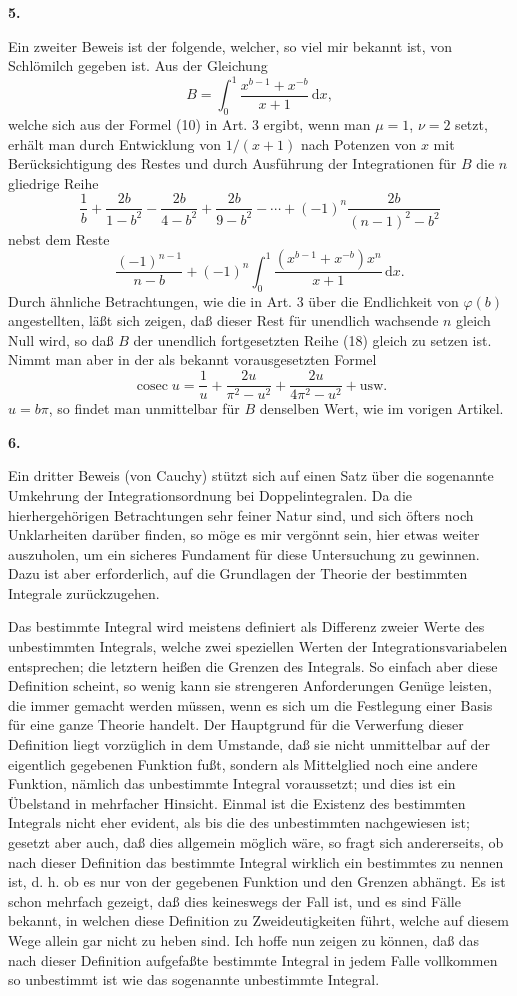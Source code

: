 \documentclass[11pt]{article}
\newcommand{\dd}{\,\mathrm d}
\newcommand{\cosec}{\operatorname{cosec}}
\newcommand{\art}[1]{\bigskip\begin{center}\large\bfseries #1.\end{center}\nopagebreak}
\begin{document}
\art{5}

Ein zweiter Beweis ist der folgende, welcher, so viel mir bekannt ist, von Schlömilch gegeben ist. Aus der Gleichung
\[
B=\int_0^1\frac{x^{b-1}+x^{-b}}{x+1}\dd x,
\]
welche sich aus der Formel (10) in Art. 3 ergibt, wenn man $\mu=1$, $\nu=2$ setzt, erhält man durch Entwicklung von $1/(x+1)$ nach Potenzen von $x$ mit Berücksichtigung des Restes und durch Ausführung der Integrationen für $B$ die $n$gliedrige Reihe
\begin{equation}
\frac1b+\frac{2b}{1-b^2}-\frac{2b}{4-b^2}+\frac{2b}{9-b^2}-\cdots+(-1)^n\frac{2b}{(n-1)^2-b^2}
\tag{18}
\end{equation}
nebst dem Reste
\[
\frac{(-1)^{n-1}}{n-b}+(-1)^n\int_0^1\frac{(x^{b-1}+x^{-b})x^n}{x+1}\dd x.
\]
Durch ähnliche Betrachtungen, wie die in Art. 3 über die Endlichkeit von $\varphi(b)$ angestellten, läßt sich zeigen, daß dieser Rest für unendlich wachsende $n$ gleich Null wird, so daß $B$ der unendlich fortgesetzten Reihe (18) gleich zu setzen ist. Nimmt man aber in der als bekannt vorausgesetzten Formel
\[
\cosec u=\frac1u+\frac{2u}{\pi^2-u^2}+\frac{2u}{4\pi^2-u^2}+\text{usw.}
\]
$u=b\pi$, so findet man unmittelbar für $B$ denselben Wert, wie im vorigen Artikel.

\art{6}

Ein dritter Beweis (von Cauchy) stützt sich auf einen Satz über die sogenannte Umkehrung der Integrationsordnung bei Doppelintegralen. Da die hierhergehörigen Betrachtungen sehr feiner Natur sind, und sich öfters noch Unklarheiten darüber finden, so möge es mir vergönnt sein, hier etwas weiter auszuholen, um ein sicheres Fundament für diese Untersuchung zu gewinnen. Dazu ist aber erforderlich, auf die Grundlagen der Theorie der bestimmten Integrale zurückzugehen.

Das bestimmte Integral wird meistens definiert als Differenz zweier Werte des unbestimmten Integrals, welche zwei speziellen Werten der Integrationsvariabelen entsprechen; die letztern heißen die Grenzen des Integrals. So einfach aber diese Definition scheint, so wenig kann sie strengeren Anforderungen Genüge leisten, die immer gemacht werden müssen, wenn es sich um die Festlegung einer Basis für eine ganze Theorie handelt. Der Hauptgrund für die Verwerfung dieser Definition liegt vorzüglich in dem Umstande, daß sie nicht unmittelbar auf der eigentlich gegebenen Funktion fußt, sondern als Mittelglied noch eine andere Funktion, nämlich das unbestimmte Integral voraussetzt; und dies ist ein Übelstand in mehrfacher Hinsicht. Einmal ist die Existenz des bestimmten Integrals nicht eher evident, als bis die des unbestimmten nachgewiesen ist; gesetzt aber auch, daß dies allgemein möglich wäre, so fragt sich andererseits, ob nach dieser Definition das bestimmte Integral wirklich ein bestimmtes zu nennen ist, d. h. ob es nur von der gegebenen Funktion und den Grenzen abhängt. Es ist schon mehrfach gezeigt, daß dies keineswegs der Fall ist, und es sind Fälle bekannt, in welchen diese Definition zu Zweideutigkeiten führt, welche auf diesem Wege allein gar nicht zu heben sind. Ich hoffe nun zeigen zu können, daß das nach dieser Definition aufgefaßte bestimmte Integral in jedem Falle vollkommen so unbestimmt ist wie das sogenannte unbestimmte Integral.
\end{document}
